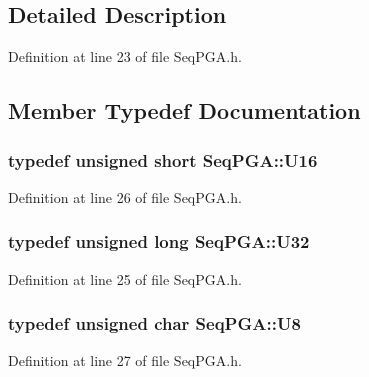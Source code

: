 \subsection{Detailed Description}


Definition at line 23 of file SeqPGA.h.

\subsection{Member Typedef Documentation}
\hypertarget{classSeqPGA_ab58f68f9484bdc99722a29f533f0d4e3}{
\subsubsection[{U16}]{\setlength{\rightskip}{0pt plus 5cm}typedef unsigned short {\bf SeqPGA::U16}}}
\label{classSeqPGA_ab58f68f9484bdc99722a29f533f0d4e3}


Definition at line 26 of file SeqPGA.h.\hypertarget{classSeqPGA_a9e9a99e1d7586223a7c118a19deef42c}{
\subsubsection[{U32}]{\setlength{\rightskip}{0pt plus 5cm}typedef unsigned long {\bf SeqPGA::U32}}}
\label{classSeqPGA_a9e9a99e1d7586223a7c118a19deef42c}


Definition at line 25 of file SeqPGA.h.\hypertarget{classSeqPGA_ace27b11f060e537a6fd756cc3eca5347}{
\subsubsection[{U8}]{\setlength{\rightskip}{0pt plus 5cm}typedef unsigned char {\bf SeqPGA::U8}}}
\label{classSeqPGA_ace27b11f060e537a6fd756cc3eca5347}


Definition at line 27 of file SeqPGA.h.

